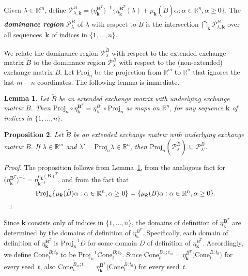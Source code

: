 \documentclass{amsart}
\newtheorem{proposition}{Proposition}[section]
\newtheorem{lemma}[proposition]{Lemma}
\theoremstyle{definition}
\theoremstyle{remark}
\numberwithin{equation}{section}
\newcommand{\newword}[1]{\textbf{\emph{#1}}}
\newcommand{\reals}{\mathbb R}
\newcommand{\set}[1]{{\lbrace #1 \rbrace}}
\newcommand{\sett}[1]{{\bigl\lbrace #1 \bigr\rbrace}}
\newcommand{\GG}{{\mathbf G}}
\newcommand{\0}{{\mathbf{0}}}
\newcommand{\Cone}{\mathrm{Cone}}
\newcommand{\Proj}{\mathrm{Proj}}
\newcommand{\kk}{{\boldsymbol{k}}}
\newcommand{\tB}{{\tilde{B}}}
\newcommand{\BB}{\mathbf{B}}
\renewcommand{\P}{\mathcal{P}}
\begin{document}
Given $\lambda\in\reals^m$, define $\P^\tB_{\lambda,\kk}=\bigl(\eta_{\kk}^{\BB^T}\bigr)^{-1}\sett{\eta_\kk^{\BB^T}(\lambda)+\mu_\kk(\tB)\alpha:\alpha\in\reals^n,\alpha\ge0}$.
The \newword{dominance region} $\P^\tB_\lambda$ of $\lambda$ with respect to $\tB$ is the intersection $\bigcap_\kk\P^\tB_{\lambda,\kk}$ over all sequences~$\kk$ of indices in $\set{1,\ldots,n}$.

We relate the dominance region $\P_\lambda^\tB$ with respect to the extended exchange matrix $\tB$ to the dominance region $\P_\lambda^B$ with respect to the (non-extended) exchange matrix $B$.
Let $\Proj_n$ be the projection from $\reals^m$ to $\reals^n$ that ignores the last $m-n$ coordinates.
The following lemma is immediate.

\begin{lemma}\label{eta proj}
Let $\tB$ be an extended exchange matrix with underlying exchange matrix $B$.
Then $\Proj_n\circ\eta_\kk^{\BB^T}=\eta_\kk^{B^T}\circ\Proj_n$ as maps on $\reals^n$, for any sequence $\kk$ of indices in $\set{1,\ldots,n}$.
\end{lemma}

\begin{proposition}\label{contains proj}
Let $\tB$ be an extended exchange matrix with underlying exchange matrix $B$.
If $\lambda\in\reals^m$ and $\lambda'=\Proj_n\lambda\in\reals^n$, then $\Proj_n(\P_\lambda^\tB)\subseteq\P_{\lambda'}^B$.
\end{proposition}
\begin{proof}
The proposition follows from Lemma~\ref{eta proj}, from the analogous fact for $\bigl(\eta_\kk^{\BB^T}\bigr)^{-1}=\eta_{\kk^{-1}}^{\mu_\kk(\BB)^T}$, and from the fact that 
\[\Proj_n\set{\mu_\kk(\tB)\alpha:\alpha\in\reals^n,\alpha\ge0}=\set{\mu_\kk(B)\alpha:\alpha\in\reals^n,\alpha\ge0}.\qedhere\]
\end{proof}

Since $\kk$ consists only of indices in $\set{1,\ldots,n}$, the domains of definition of $\eta_\kk^{\BB^T}$ are determined by the domains of definition of $\eta_\kk^{B^T}$.
Specifically, each domain of definition of $\eta_\kk^{\BB^T}$ is $\Proj_n^{-1}D$ for some domain $D$ of definition of $\eta_\kk^{B^T}$.
Accordingly, we define $\Cone_t^{\tB;t_0}$ to be %
$\Proj_n^{-1}\Cone_t^{B;t_0}$.
Since $\Cone_t^{B_m;t_m}=\eta_\kk^{B^T}\bigl(\Cone_t^{B;t_0}\bigr)$ for every seed~$t$, also $\Cone_t^{\tB_m;t_m}=\eta_\kk^{\BB^T}\bigl(\Cone_t^{\tB;t_0}\bigr)$ for every seed~$t$.
\end{document}
